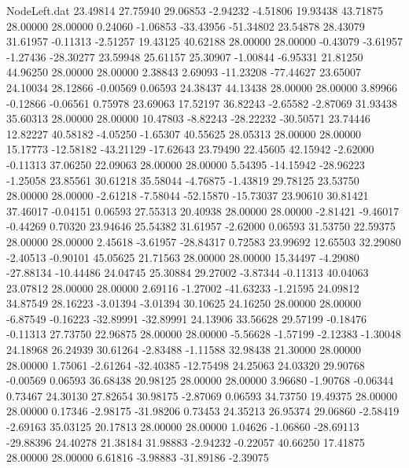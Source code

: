 \begin{filecontents}{NodeLeft.dat}
  23.49814   27.75940   29.06853    -2.94232   -4.51806   19.93438   43.71875   28.00000   28.00000    0.24060   -1.06853  -33.43956  -51.34802
  23.54878   28.43079   31.61957    -0.11313   -2.51257   19.43125   40.62188   28.00000   28.00000   -0.43079   -3.61957   -1.27436  -28.30277
  23.59948   25.61157   25.30907    -1.00844   -6.95331   21.81250   44.96250   28.00000   28.00000    2.38843    2.69093  -11.23208  -77.44627
  23.65007   24.10034   28.12866    -0.00569    0.06593   24.38437   44.13438   28.00000   28.00000    3.89966   -0.12866   -0.06561    0.75978
  23.69063   17.52197   36.82243    -2.65582   -2.87069   31.93438   35.60313   28.00000   28.00000   10.47803   -8.82243  -28.22232  -30.50571
  23.74446   12.82227   40.58182    -4.05250   -1.65307   40.55625   28.05313   28.00000   28.00000   15.17773  -12.58182  -43.21129  -17.62643
  23.79490   22.45605   42.15942    -2.62000   -0.11313   37.06250   22.09063   28.00000   28.00000    5.54395  -14.15942  -28.96223   -1.25058
  23.85561   30.61218   35.58044    -4.76875   -1.43819   29.78125   23.53750   28.00000   28.00000   -2.61218   -7.58044  -52.15870  -15.73037
  23.90610   30.81421   37.46017    -0.04151    0.06593   27.55313   20.40938   28.00000   28.00000   -2.81421   -9.46017   -0.44269    0.70320
  23.94646   25.54382   31.61957    -2.62000    0.06593   31.53750   22.59375   28.00000   28.00000    2.45618   -3.61957  -28.84317    0.72583
  23.99692   12.65503   32.29080    -2.40513   -0.90101   45.05625   21.71563   28.00000   28.00000   15.34497   -4.29080  -27.88134  -10.44486
  24.04745   25.30884   29.27002    -3.87344   -0.11313   40.04063   23.07812   28.00000   28.00000    2.69116   -1.27002  -41.63233   -1.21595
  24.09812   34.87549   28.16223    -3.01394   -3.01394   30.10625   24.16250   28.00000   28.00000   -6.87549   -0.16223  -32.89991  -32.89991
  24.13906   33.56628   29.57199    -0.18476   -0.11313   27.73750   22.96875   28.00000   28.00000   -5.56628   -1.57199   -2.12383   -1.30048
  24.18968   26.24939   30.61264    -2.83488   -1.11588   32.98438   21.30000   28.00000   28.00000    1.75061   -2.61264  -32.40385  -12.75498
  24.25063   24.03320   29.90768    -0.00569    0.06593   36.68438   20.98125   28.00000   28.00000    3.96680   -1.90768   -0.06344    0.73467
  24.30130   27.82654   30.98175    -2.87069    0.06593   34.73750   19.49375   28.00000   28.00000    0.17346   -2.98175  -31.98206    0.73453
  24.35213   26.95374   29.06860    -2.58419   -2.69163   35.03125   20.17813   28.00000   28.00000    1.04626   -1.06860  -28.69113  -29.88396
  24.40278   21.38184   31.98883    -2.94232   -0.22057   40.66250   17.41875   28.00000   28.00000    6.61816   -3.98883  -31.89186   -2.39075

\end{filecontents}
